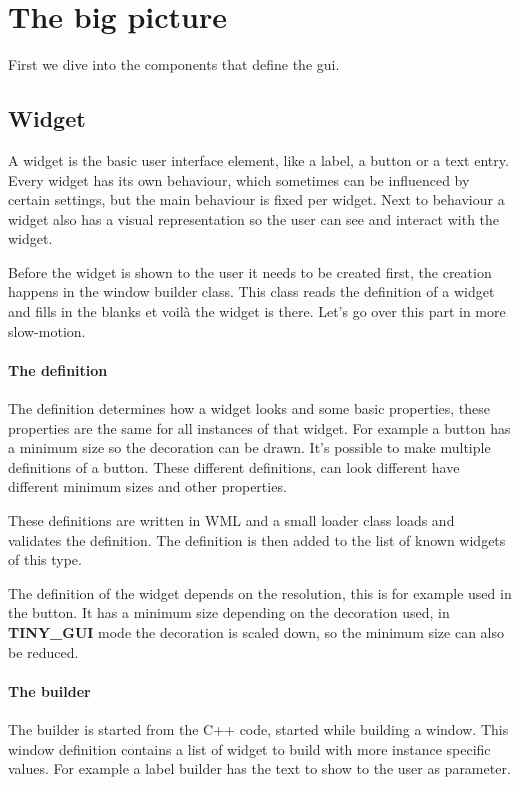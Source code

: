 \documentclass[a4paper,notitlepage]{report}
\begin{document}
\section{The big picture}

First we dive into the components that define the gui.

\subsection{Widget}

A widget is the basic user interface element, like a label, a button or a text
entry. Every widget has its own behaviour, which sometimes can be influenced by
certain settings, but the main behaviour is fixed per widget. Next to behaviour
a widget also has a visual representation so the user can see and interact with
the widget.

Before the widget is shown to the user it needs to be created first, the
creation happens in the window builder class. This class reads the definition of
a widget and fills in the blanks et voil\`a the widget is there. Let's go over
this part in more slow-motion.

\paragraph{The definition}
The definition determines how a widget looks and some basic properties, these
properties are the same for all instances of that widget. For example a button
has a minimum size so the decoration can be drawn. It's possible to make
multiple definitions of a button. These different definitions, can look
different have different minimum sizes and other properties.

These definitions are written in WML and a small loader class loads and
validates the definition. The definition is then added to the list of known
widgets of this type.

The definition of the widget depends on the resolution, this is for example used
in the button. It has a minimum size depending on the decoration used, in
\textbf{TINY\_GUI} mode the decoration is scaled down, so the minimum size can
also be reduced.

\paragraph{The builder}
The builder is started from the C++ code, started while building a window. This
window definition contains a list of widget to build with more instance specific
values. For example a label builder has the text to show to the user as
parameter.
\end{document}
